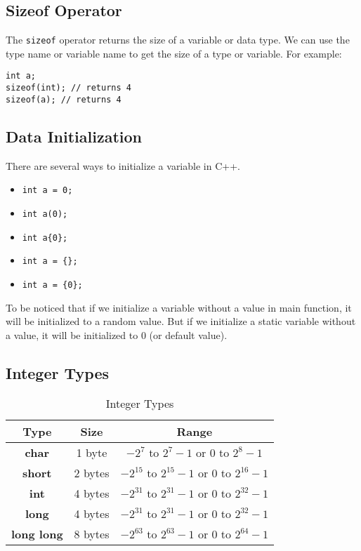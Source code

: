 \documentclass[a4paper,12pt]{article}
\begin{document}
\subsection{Sizeof Operator}

The \texttt{sizeof} operator returns the size of a variable or data type.
We can use the type name or variable name to get the size of a type or variable.
For example:
\begin{verbatim}
int a;
sizeof(int); // returns 4
sizeof(a); // returns 4
\end{verbatim}

\subsection{Data Initialization}

There are several ways to initialize a variable in C++.

\begin{itemize}
	\item \texttt{int a = 0;}
	\item \texttt{int a(0);}
	\item \texttt{int a\{0\};}
	\item \texttt{int a = \{\};}
	\item \texttt{int a = \{0\};}
\end{itemize}

To be noticed that if we initialize a variable without a value in main function, it will be initialized to a random value.
But if we initialize a static variable without a value, it will be initialized to 0 (or default value).

\subsection{Integer Types}

\begin{table}[H]
	\centering
	\begin{tabular}{|c|c|c|}
		\hline
		Type & Size & Range \\
		\hline
		\textbf{char} & 1 byte & $-2^7$ to $2^7-1$ or 0 to $2^8-1$ \\
		\hline
		\textbf{short} & 2 bytes & $-2^{15}$ to $2^{15}-1$ or 0 to $2^{16}-1$ \\
		\hline
		\textbf{int} & 4 bytes & $-2^{31}$ to $2^{31}-1$ or 0 to $2^{32}-1$ \\
		\hline
		\textbf{long} & 4 bytes & $-2^{31}$ to $2^{31}-1$ or 0 to $2^{32}-1$ \\
		\hline
		\textbf{long long} & 8 bytes & $-2^{63}$ to $2^{63}-1$ or 0 to $2^{64}-1$ \\
		\hline
	\end{tabular}
	\caption{Integer Types}
\end{table}
\end{document}
